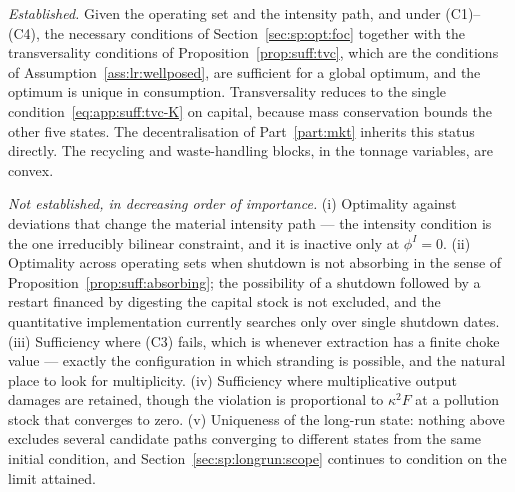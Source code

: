 \emph{Established.} Given the operating set and the intensity path, and under (C1)--(C4), the necessary conditions of Section~\ref{sec:sp:opt:foc} together with the transversality conditions of Proposition~\ref{prop:suff:tvc}, which are the conditions of Assumption~\ref{ass:lr:wellposed}, are sufficient for a global optimum, and the optimum is unique in consumption. Transversality reduces to the single condition~\eqref{eq:app:suff:tvc-K} on capital, because mass conservation bounds the other five states. The decentralisation of Part~\ref{part:mkt} inherits this status directly. The recycling and waste-handling blocks, in the tonnage variables, are convex.

\emph{Not established, in decreasing order of importance.} (i) Optimality against deviations that change the material intensity path --- the intensity condition is the one irreducibly bilinear constraint, and it is inactive only at $\phi^I=0$. (ii) Optimality across operating sets when shutdown is not absorbing in the sense of Proposition~\ref{prop:suff:absorbing}; the possibility of a shutdown followed by a restart financed by digesting the capital stock is not excluded, and the quantitative implementation currently searches only over single shutdown dates. (iii) Sufficiency where (C3) fails, which is whenever extraction has a finite choke value --- exactly the configuration in which stranding is possible, and the natural place to look for multiplicity. (iv) Sufficiency where multiplicative output damages are retained, though the violation is proportional to $\kappa^2 F$ at a pollution stock that converges to zero. (v) Uniqueness of the long-run state: nothing above excludes several candidate paths converging to different states from the same initial condition, and Section~\ref{sec:sp:longrun:scope} continues to condition on the limit attained.
